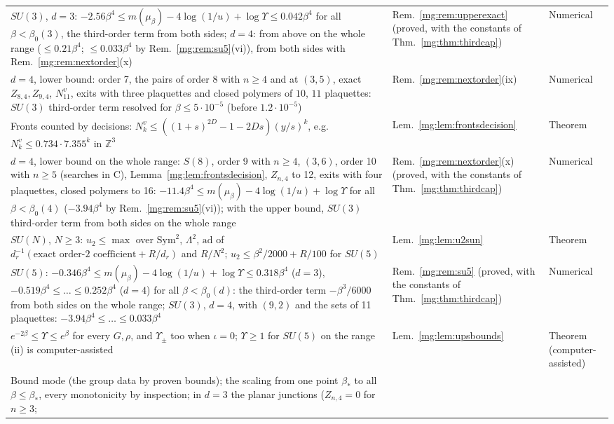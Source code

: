 \documentclass[11pt,a4paper]{article}
\theoremstyle{definition}
\theoremstyle{remark}
\newcommand{\Z}{\mathbb{Z}}
\begin{document}
\begin{longtable}{@{}p{}p{}p{}@{}}
$SU(3)$, $d=3$: $-2.56\beta^4\le m(\mu_\beta)-4\log(1/u)+\log\Upsilon\le0.042\beta^4$ for all $\beta<\beta_0(3)$, the third-order term from both sides; $d=4$: from above on the whole range ($\le0.21\beta^4$; $\le0.033\beta^4$ by Rem.~\ref{mg:rem:su5}(vi)), from both sides with Rem.~\ref{mg:rem:nextorder}(x) & Rem.~\ref{mg:rem:upperexact} (proved, with the constants of Thm.~\ref{mg:thm:thirdcap}) & Numerical\\
$d=4$, lower bound: order 7, the pairs of order 8 with $n\ge4$ and at $(3,5)$, exact $Z_{8,4},Z_{9,4}$, $N^v_{11}$, exits with three plaquettes and closed polymers of $10$, $11$ plaquettes: $SU(3)$ third-order term resolved for $\beta\le5\cdot10^{-5}$ (before $1.2\cdot10^{-5}$) & Rem.~\ref{mg:rem:nextorder}(ix) & Numerical\\
Fronts counted by decisions: $N^v_k\le((1+s)^{2D}-1-2Ds)(y/s)^k$, e.g.\ $N^v_k\le0.734\cdot7.355^k$ in $\Z^3$ & Lem.~\ref{mg:lem:frontsdecision} & Theorem\\
$d=4$, lower bound on the whole range: $S(8)$, order 9 with $n\ge4$, $(3,6)$, order 10 with $n\ge5$ (searches in C), Lemma~\ref{mg:lem:frontsdecision}, $Z_{n,4}$ to 12, exits with four plaquettes, closed polymers to 16: $-11.4\beta^4\le m(\mu_\beta)-4\log(1/u)+\log\Upsilon$ for all $\beta<\beta_0(4)$ ($-3.94\beta^4$ by Rem.~\ref{mg:rem:su5}(vi)); with the upper bound, $SU(3)$ third-order term from both sides on the whole range & Rem.~\ref{mg:rem:nextorder}(x) (proved, with the constants of Thm.~\ref{mg:thm:thirdcap}) & Numerical\\
$SU(N)$, $N\ge3$: $u_2\le\max$ over $\mathrm{Sym}^2$, $\Lambda^2$, $\mathrm{ad}$ of $d_r^{-1}(\text{exact order-2 coefficient}+R/d_r)$ and $R/N^2$; $u_2\le\beta^2/2000+R/100$ for $SU(5)$ & Lem.~\ref{mg:lem:u2sun} & Theorem\\
$SU(5)$: $-0.346\beta^4\le m(\mu_\beta)-4\log(1/u)+\log\Upsilon\le0.318\beta^4$ ($d=3$), $-0.519\beta^4\le\dots\le0.252\beta^4$ ($d=4$) for all $\beta<\beta_0(d)$: the third-order term $-\beta^3/6000$ from both sides on the whole range; $SU(3)$, $d=4$, with $(9,2)$ and the sets of 11 plaquettes: $-3.94\beta^4\le\dots\le0.033\beta^4$ & Rem.~\ref{mg:rem:su5} (proved, with the constants of Thm.~\ref{mg:thm:thirdcap}) & Numerical\\
$e^{-2\beta}\le\Upsilon\le e^\beta$ for every $G,\rho$, and $\Upsilon_\pm$ too when $\iota=0$; $\Upsilon\ge1$ for $SU(5)$ on the range (ii) is computer-assisted & Lem.~\ref{mg:lem:upsbounds} & Theorem (computer-assisted)\\
Bound mode (the group data by proven bounds); the scaling from one point $\beta_*$ to all $\beta\le\beta_*$, every monotonicity by inspection; in $d=3$ the planar junctions ($Z_{n,4}=0$ for $n\ge3$;

\end{longtable}
\end{document}
